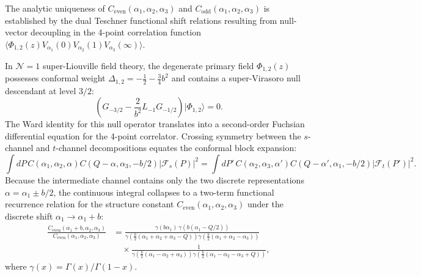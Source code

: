 \documentclass[11pt,letterpaper]{article}
\theoremstyle{plain}
\begin{document}
The analytic uniqueness of $C_{\text{even}}(\alpha_1, \alpha_2, \alpha_3)$ and $C_{\text{odd}}(\alpha_1, \alpha_2, \alpha_3)$ is established by the dual Teschner functional shift relations resulting from null-vector decoupling in the 4-point correlation function $\langle \Phi_{1,2}(z) V_{\alpha_1}(0) V_{\alpha_2}(1) V_{\alpha_3}(\infty) \rangle$.

In $\mathcal{N}=1$ super-Liouville field theory, the degenerate primary field $\Phi_{1,2}(z)$ possesses conformal weight $\Delta_{1,2} = -\frac{1}{2} - \frac{3}{4}b^2$ and contains a super-Virasoro null descendant at level $3/2$:
\begin{equation}
\label{eq:super-null-vector}
\left( G_{-3/2} - \frac{2}{b^2} L_{-1} G_{-1/2} \right) \big| \Phi_{1,2} \rangle = 0.
\end{equation}
The Ward identity for this null operator translates into a second-order Fuchsian differential equation for the 4-point correlator. Crossing symmetry between the $s$-channel and $t$-channel decompositions equates the conformal block expansion:
\begin{equation}
\int dP \, C(\alpha_1, \alpha_2, \alpha) C(Q-\alpha, \alpha_3, -b/2) \big| \mathcal{F}_s(P) \big|^2 = \int dP' \, C(\alpha_2, \alpha_3, \alpha') C(Q-\alpha', \alpha_1, -b/2) \big| \mathcal{F}_t(P') \big|^2.
\end{equation}
Because the intermediate channel contains only the two discrete representations $\alpha = \alpha_1 \pm b/2$, the continuous integral collapses to a two-term functional recurrence relation for the structure constant $C_{\text{even}}(\alpha_1, \alpha_2, \alpha_3)$ under the discrete shift $\alpha_1 \to \alpha_1 + b$:
\begin{equation}
\label{eq:teschner-shift-ratio-exact}
\begin{aligned}
\frac{C_{\text{even}}(\alpha_1 + b, \alpha_2, \alpha_3)}{C_{\text{even}}(\alpha_1, \alpha_2, \alpha_3)} &= \frac{\gamma(b\alpha_1)\,\gamma(b(\alpha_1 - Q/2))}{\gamma\!\left(\frac{b}{2}(\alpha_1 + \alpha_2 + \alpha_3 - Q)\right) \gamma\!\left(\frac{b}{2}(\alpha_1 + \alpha_2 - \alpha_3)\right)} \\
&\quad\times \frac{1}{\gamma\!\left(\frac{b}{2}(\alpha_1 - \alpha_2 + \alpha_3)\right) \gamma\!\left(\frac{b}{2}(\alpha_1 - \alpha_2 - \alpha_3 + Q)\right)},
\end{aligned}
\end{equation}
where $\gamma(x) = \Gamma(x)/\Gamma(1-x)$.
\end{document}
